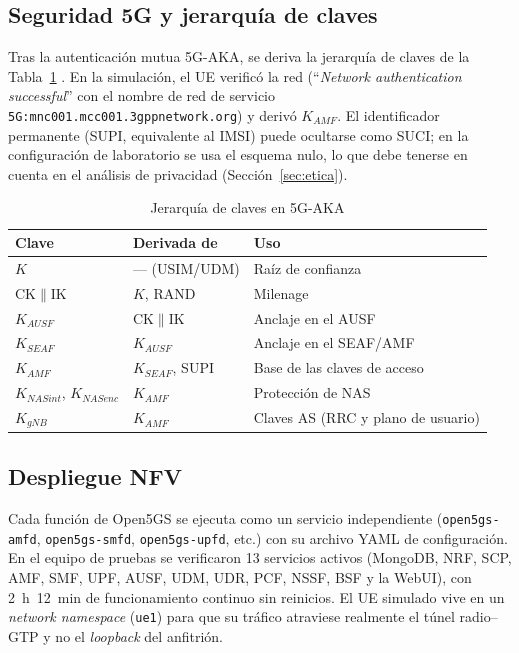 \documentclass[conference]{IEEEtran}
\begin{document}
\subsection{Seguridad 5G y jerarquía de claves}
Tras la autenticación mutua 5G-AKA, se deriva la jerarquía de claves de la Tabla~\ref{tab:claves} \cite{ts33501}. En la simulación, el UE verificó la red (``\textit{Network authentication successful}'' con el nombre de red de servicio \texttt{5G:mnc001.mcc001.3gppnetwork.org}) y derivó $K_{AMF}$. El identificador permanente (SUPI, equivalente al IMSI) puede ocultarse como SUCI; en la configuración de laboratorio se usa el esquema nulo, lo que debe tenerse en cuenta en el análisis de privacidad (Sección~\ref{sec:etica}).

\begin{table}[!t]
\caption{Jerarquía de claves en 5G-AKA}
\label{tab:claves}
\centering
\footnotesize
\renewcommand{\arraystretch}{1.15}
\begin{tabular}{p{1.9cm}p{2.3cm}p{3.3cm}}
\toprule
\textbf{Clave} & \textbf{Derivada de} & \textbf{Uso} \\
\midrule
$K$ & --- (USIM/UDM) & Raíz de confianza \\
CK$\|$IK & $K$, RAND & Milenage \\
$K_{AUSF}$ & CK$\|$IK & Anclaje en el AUSF \\
$K_{SEAF}$ & $K_{AUSF}$ & Anclaje en el SEAF/AMF \\
$K_{AMF}$ & $K_{SEAF}$, SUPI & Base de las claves de acceso \\
$K_{NASint}$, $K_{NASenc}$ & $K_{AMF}$ & Protección de NAS \\
$K_{gNB}$ & $K_{AMF}$ & Claves AS (RRC y plano de usuario) \\
\bottomrule
\end{tabular}
\end{table}

\subsection{Despliegue NFV}
Cada función de Open5GS se ejecuta como un servicio independiente (\texttt{open5gs-amfd}, \texttt{open5gs-smfd}, \texttt{open5gs-upfd}, etc.) con su archivo YAML de configuración. En el equipo de pruebas se verificaron 13 servicios activos (MongoDB, NRF, SCP, AMF, SMF, UPF, AUSF, UDM, UDR, PCF, NSSF, BSF y la WebUI), con 2~h~12~min de funcionamiento continuo sin reinicios. El UE simulado vive en un \textit{network namespace} (\texttt{ue1}) para que su tráfico atraviese realmente el túnel radio--GTP y no el \textit{loopback} del anfitrión.
\end{document}
